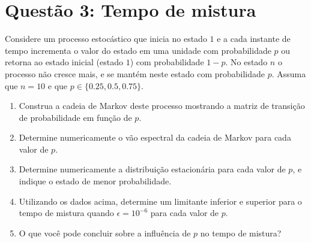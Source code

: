\section*{Questão 3: Tempo de mistura}
Considere um processo estocástico que inicia no estado $1$ e a cada instante de tempo incrementa o valor do estado em uma unidade com probabilidade $p$ ou retorna ao estado inicial (estado $1$) com probabilidade $1-p$. No estado $n$ o processo não cresce mais, e se mantém neste estado com probabilidade $p$. Assuma que $n = 10$ e que $p \in \{0.25, 0.5, 0.75\}$.

\begin{enumerate}
    \item Construa a cadeia de Markov deste processo mostrando a matriz de transição de probabilidade em função de $p$.
    \begin{resposta}

    \end{resposta}
    \item Determine numericamente o vão espectral da cadeia de Markov para cada valor de $p$.
    \begin{resposta}

    \end{resposta}
    \item Determine numericamente a distribuição estacionária para cada valor de $p$, e indique o estado de menor probabilidade.
    \begin{resposta}

    \end{resposta}
    \item Utilizando os dados acima, determine um limitante inferior e superior para o tempo de mistura quando $\epsilon = 10^{-6}$ para cada valor de $p$.
    \begin{resposta}

    \end{resposta}
    \item O que você pode concluir sobre a influência de $p$ no tempo de mistura?
    \begin{resposta}

    \end{resposta}
\end{enumerate}

